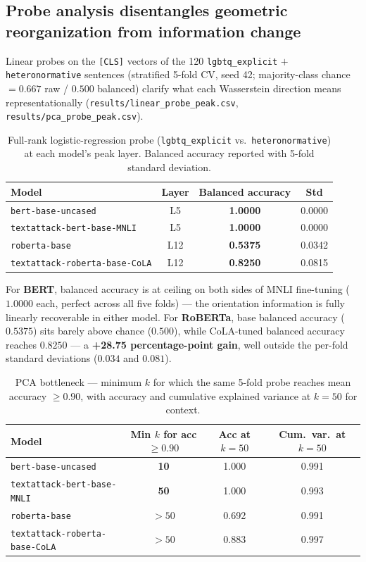 \documentclass[11pt]{article}
\begin{document}
\subsection{Probe analysis disentangles geometric reorganization from information change}\label{sec:probes_results}

Linear probes on the \texttt{[CLS]} vectors of the 120 \texttt{lgbtq\_explicit} $+$ \texttt{heteronormative} sentences (stratified 5-fold CV, seed 42; majority-class chance $= 0.667$ raw / $0.500$ balanced) clarify what each Wasserstein direction means representationally (\texttt{results/linear\_probe\_peak.csv}, \texttt{results/pca\_probe\_peak.csv}).

\begin{table}[t]
\centering
\caption{Full-rank logistic-regression probe (\texttt{lgbtq\_explicit} vs.\ \texttt{heteronormative}) at each model's peak layer. Balanced accuracy reported with 5-fold standard deviation.}
\label{tab:linear_probe}
\begin{tabular}{lccc}
\toprule
Model & Layer & Balanced accuracy & Std \\
\midrule
\texttt{bert-base-uncased}             & L5  & \textbf{1.0000} & 0.0000 \\
\texttt{textattack-bert-base-MNLI}     & L5  & \textbf{1.0000} & 0.0000 \\
\texttt{roberta-base}                  & L12 & \textbf{0.5375} & 0.0342 \\
\texttt{textattack-roberta-base-CoLA}  & L12 & \textbf{0.8250} & 0.0815 \\
\bottomrule
\end{tabular}
\end{table}

For \textbf{BERT}, balanced accuracy is at ceiling on both sides of MNLI fine-tuning ($1.0000$ each, perfect across all five folds) --- the orientation information is fully linearly recoverable in either model. For \textbf{RoBERTa}, base balanced accuracy ($0.5375$) sits barely above chance ($0.500$), while CoLA-tuned balanced accuracy reaches $0.8250$ --- a \textbf{+28.75 percentage-point gain}, well outside the per-fold standard deviations ($0.034$ and $0.081$).

\begin{table}[t]
\centering
\caption{PCA bottleneck --- minimum $k$ for which the same 5-fold probe reaches mean accuracy $\geq 0.90$, with accuracy and cumulative explained variance at $k = 50$ for context.}
\label{tab:pca_bottleneck}
\begin{tabular}{lccc}
\toprule
Model & Min $k$ for acc $\geq 0.90$ & Acc at $k = 50$ & Cum.\ var.\ at $k = 50$ \\
\midrule
\texttt{bert-base-uncased}             & \textbf{10}    & 1.000 & 0.991 \\
\texttt{textattack-bert-base-MNLI}     & \textbf{50}    & 1.000 & 0.993 \\
\texttt{roberta-base}                  & \textbf{$> 50$} & 0.692 & 0.991 \\
\texttt{textattack-roberta-base-CoLA}  & \textbf{$> 50$} & 0.883 & 0.997 \\
\bottomrule
\end{tabular}
\end{table}
\end{document}
